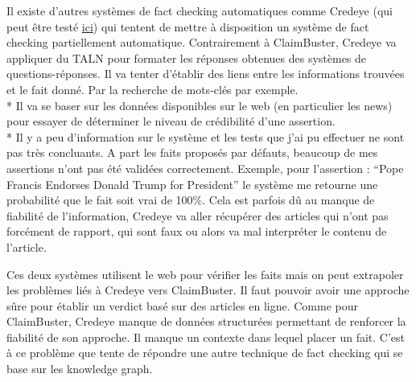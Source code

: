 Il existe d'autres systèmes de fact checking automatiques comme Credeye \cite{popat2018credeye} (qui peut être testé \href{https://gate.d5.mpi-inf.mpg.de/credeye/}{ici}) qui tentent de mettre à disposition un système de fact checking partiellement automatique. Contrairement à ClaimBuster, Credeye va appliquer du TALN pour formater les réponses obtenues des systèmes de questions-réponses. Il va tenter d'établir des liens entre les informations trouvées et le fait donné. Par la recherche de mots-clés par exemple.
\\*
Il va se baser sur les données disponibles sur le web (en particulier les news) pour essayer de déterminer le niveau de crédibilité d'une assertion. 
\\*
Il y a peu d'information sur le système et les tests que j'ai pu effectuer ne sont pas très concluants. A part les faits proposés par défauts, beaucoup de mes assertions n'ont pas été validées correctement. Exemple, pour l'assertion : \enquote{Pope Francis Endorses Donald Trump for President} le système me retourne une probabilité que le fait soit vrai de 100\%. Cela est parfois dû au manque de fiabilité de l'information, Credeye va aller récupérer des articles qui n'ont pas forcément de rapport, qui sont faux ou alors va mal interpréter le contenu de l'article.

Ces deux systèmes utilisent le web pour vérifier les faits mais on peut extrapoler les problèmes liés à Credeye vers ClaimBuster. Il faut pouvoir avoir une approche sûre pour établir un verdict basé sur des articles en ligne. Comme pour ClaimBuster, Credeye manque de données structurées permettant de renforcer la fiabilité de son approche. Il manque un contexte dans lequel placer un fait. C'est à ce problème que tente de répondre une autre technique de fact checking qui se base sur les knowledge graph.